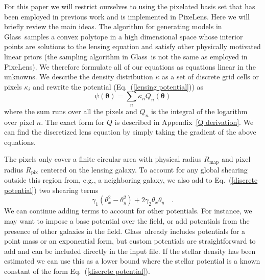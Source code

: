 \documentclass[galley]{mn2e}
\newcommand{\Glass}{{\sc Glass}}
\newcommand{\PixeLens}{{\sc PixeLens}}
\newcommand{\Rmap}{\ensuremath{R_\mathrm{map}}}
\newcommand{\Rpix}{\ensuremath{R_\mathrm{pix}}}
\newcommand{\eqnref}[1] {Eq.~(\ref{#1})}
\newcommand{\appref}[1] {Appendix~\ref{#1}}
\renewcommand{\vec}[1]{\ensuremath{\boldsymbol{#1}}}
\begin{document}
For this paper we will restrict ourselves to using the pixelated basis set that
has been employed in previous work and is implemented in \PixeLens. Here we
will briefly review the main ideas. The algorithm for generating models in
\Glass\ samples a convex polytope in a high dimensional space whose interior
points are solutions to the lensing equation and satisfy other physically
motivated linear priors (the sampling algorithm in \Glass\ is not the same as
employed in \PixeLens).  We therefore formulate all of our equations as
equations linear in the unknowns. We describe the density distribution $\kappa$
as a set of discrete grid cells or pixels $\kappa_i$ and rewrite the potential
(\eqnref{lensing potential}) as
%
\begin{equation}
  \psi(\vec\theta) = \sum_n \kappa_n Q_n(\vec\theta)
  \label{discrete potential}
\end{equation}
%
where the sum runs over all the pixels and $Q_n$ is the integral of the logarithm
over pixel $n$. The exact form for $Q$ is described in \appref{Q derivation}.
We can find the discretized lens equation by simply taking the gradient of the
above equations. 

The pixels only cover a finite circular area with physical radius $\Rmap$ and
pixel radius $\Rpix$ centered on the lensing galaxy. To account for any global
shearing outside this region from, e.g., a neighboring galaxy, we also add to
\eqnref{discrete potential} two shearing terms
%
\begin{equation}
\label{shear}
\gamma_1(\theta_x^2 - \theta_y^2) + 2\gamma_2\theta_x\theta_y\quad.
\end{equation}
%
We can continue adding terms to account for other potentials. For instance,
we may want to impose a base potential over the field, or add potentials
from the presence of other galaxies in the field. \Glass\
already includes potentials for a point mass or an exponential form, but custom
potentials are straightforward to add and can be included directly in the input file.
If the stellar density has been estimated we can use this as a lower bound
where the stellar potential is a known constant of the form \eqnref{discrete
potential}.

%
%
\end{document}
